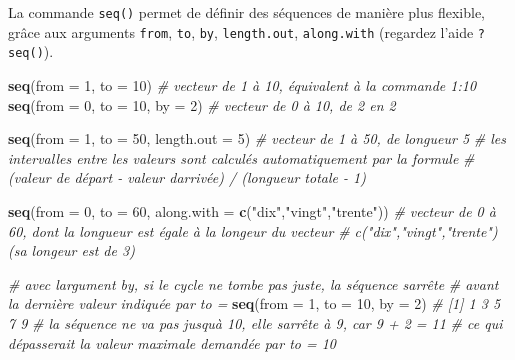 \documentclass[
]{book}
\newenvironment{Shaded}{\begin{snugshade}}{\end{snugshade}}
\newcommand{\AttributeTok}[1]{\textcolor[rgb]{0.13,0.29,0.53}{#1}}
\newcommand{\CommentTok}[1]{\textcolor[rgb]{0.56,0.35,0.01}{\textit{#1}}}
\newcommand{\DecValTok}[1]{\textcolor[rgb]{0.00,0.00,0.81}{#1}}
\newcommand{\FunctionTok}[1]{\textcolor[rgb]{0.13,0.29,0.53}{\textbf{#1}}}
\newcommand{\NormalTok}[1]{#1}
\newcommand{\StringTok}[1]{\textcolor[rgb]{0.31,0.60,0.02}{#1}}
\begin{document}
La commande \texttt{seq()} permet de définir des séquences de manière plus flexible,
grâce aux arguments \texttt{from}, \texttt{to}, \texttt{by}, \texttt{length.out}, \texttt{along.with} (regardez l'aide \texttt{?seq()}).

\begin{Shaded}
\begin{Highlighting}[]
\FunctionTok{seq}\NormalTok{(}\AttributeTok{from =} \DecValTok{1}\NormalTok{, }\AttributeTok{to =} \DecValTok{10}\NormalTok{) }\CommentTok{\# vecteur de 1 à 10, équivalent à la commande 1:10}
\FunctionTok{seq}\NormalTok{(}\AttributeTok{from =} \DecValTok{0}\NormalTok{, }\AttributeTok{to =} \DecValTok{10}\NormalTok{, }\AttributeTok{by =} \DecValTok{2}\NormalTok{) }\CommentTok{\# vecteur de 0 à 10, de 2 en 2}

\FunctionTok{seq}\NormalTok{(}\AttributeTok{from =} \DecValTok{1}\NormalTok{, }\AttributeTok{to =} \DecValTok{50}\NormalTok{, }\AttributeTok{length.out =} \DecValTok{5}\NormalTok{) }\CommentTok{\# vecteur de 1 à 50, de longueur 5}
\CommentTok{\# les intervalles entre les valeurs sont calculés automatiquement par la formule}
\CommentTok{\# (valeur de départ {-} valeur d\textquotesingle{}arrivée) / (longueur totale {-} 1)}

\FunctionTok{seq}\NormalTok{(}\AttributeTok{from =} \DecValTok{0}\NormalTok{, }\AttributeTok{to =} \DecValTok{60}\NormalTok{, }\AttributeTok{along.with =} \FunctionTok{c}\NormalTok{(}\StringTok{"dix"}\NormalTok{,}\StringTok{"vingt"}\NormalTok{,}\StringTok{"trente"}\NormalTok{))}
\CommentTok{\# vecteur de 0 à 60, dont la longueur est égale à la longeur du vecteur}
\CommentTok{\# c("dix","vingt","trente") (sa longeur est de 3)}

\CommentTok{\# avec l\textquotesingle{}argument \textasciigrave{}by\textasciigrave{}, si le cycle ne tombe pas juste, la séquence s\textquotesingle{}arrête }
\CommentTok{\# avant la dernière valeur indiquée par \textasciigrave{}to = \textasciigrave{}}
\FunctionTok{seq}\NormalTok{(}\AttributeTok{from =} \DecValTok{1}\NormalTok{, }\AttributeTok{to =} \DecValTok{10}\NormalTok{, }\AttributeTok{by =} \DecValTok{2}\NormalTok{)}
\CommentTok{\# [1] 1 3 5 7 9}
\CommentTok{\# la séquence ne va pas jusqu\textquotesingle{}à 10, elle s\textquotesingle{}arrête à 9, car 9 + 2 = 11}
\CommentTok{\# ce qui dépasserait la valeur maximale demandée par \textasciigrave{}to = 10\textasciigrave{}}
\end{Highlighting}
\end{Shaded}
\end{document}
